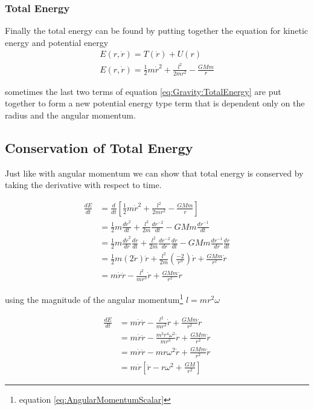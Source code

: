 \subsubsection{Total Energy}
Finally the total energy can be found by putting together the equation for kinetic energy and potential energy
\begin{align}
E(r,\dot{r})=T(\dot{r})+U(r) \nonumber \\
E(r,\dot{r})=\frac{1}{2}m \dot{r}^2 + \frac{l^2}{2mr^2}- \frac{GMm}{r}\label{eq:Gravity:TotalEnergy}
\end{align}

sometimes the last two terms of equation \ref{eq:Gravity:TotalEnergy} are put together to form a new potential energy type term that is dependent only on the radius and the angular momentum.

\subsection{Conservation of Total Energy}

Just like with angular momentum we can show that total energy is conserved by taking the derivative with respect to time.

\begin{align}
\frac{dE}{dt}&=\frac{d}{dt}\left[\frac{1}{2}m \dot{r}^2 +  \frac{l^2}{2mr^2}-\frac{GMm}{r}\right] \nonumber \\
&=\frac{1}{2}m \frac{d\dot{r}^2}{dt} +  \frac{l^2}{2m}\frac{dr^{-2}}{dt}-GMm\frac{dr^{-1}}{dt} \nonumber \\
&=\frac{1}{2}m \frac{d\dot{r}^2}{d\dot{r}}\frac{d\dot{r}}{dt} +  \frac{l^2}{2m}\frac{dr^{-2}}{dr}\frac{dr}{dt}-GMm\frac{dr^{-1}}{dr}\frac{dr}{dt} \nonumber \\
&=\frac{1}{2}m (2\dot{r})\ddot{r}+ \frac{l^2}{2m}\left(\frac{-2}{r^3}\right)\dot{r}+\frac{GMm}{r^2}\dot{r} \nonumber \\
&=m \dot{r}\ddot{r}- \frac{l^2}{mr^3}\dot{r}+\frac{GMm}{r^2}\dot{r}
\end{align}

using the magnitude of the angular momentum\footnote{equation \ref{eq:AngularMomentumScalar}} $l=mr^2\omega$

\begin{align}
\frac{dE}{dt} &=m \dot{r}\ddot{r}- \frac{l^2}{mr^3}\dot{r}+\frac{GMm}{r^2}\dot{r} \nonumber \\
&=m \dot{r}\ddot{r}- \frac{m^2r^4\omega^2}{mr^3}\dot{r}+\frac{GMm}{r^2}\dot{r} \nonumber \\
&=m \dot{r}\ddot{r}-mr\omega^2\dot{r}+\frac{GMm}{r^2}\dot{r} \nonumber \\
&=m \dot{r}\left[\ddot{r}-r\omega^2+\frac{GM}{r^2}\right]
\end{align}

